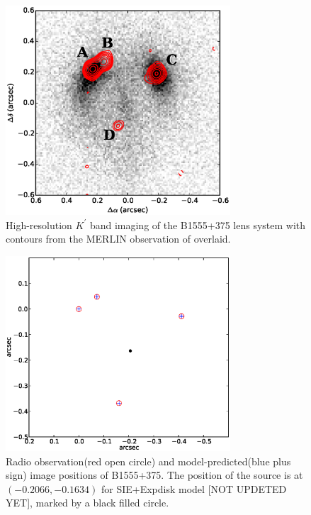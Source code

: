 \documentclass[useAMS,usenatbib]{mn2e}
\begin{document}
\begin{figure}
\includegraphics[width=84mm]{1555_ao_merlin_overlay.eps}
\caption{High-resolution  $K^\prime$ band imaging of the B1555+375 lens system 
with contours from the MERLIN observation of \citet{Marlow99} overlaid. 
%
\label{fig:merlin}}
\end{figure}


\begin{figure}
\includegraphics[width=84mm]{point_source.eps}
\caption{Radio observation(red open circle) and model-predicted(blue plus sign) image positions of B1555+375. The position of the source is at $(-0.2066,-0.1634)$ for SIE+Expdisk model [NOT UPDETED YET], marked by a black filled circle. \label{fig2}}
\end{figure}
\end{document}
